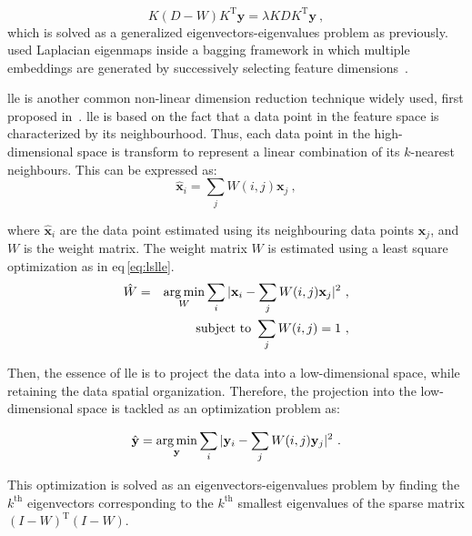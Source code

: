 \begin{equation}
  K (D-W) K^{\text{T}} \mathbf{y} = \lambda K D K^{\text{T}} \mathbf{y} \ ,
  \label{eq:sesmik}
\end{equation}
\noindent which is solved as a generalized eigenvectors-eigenvalues problem as previously.
\citeauthor{Viswanath2011} used Laplacian eigenmaps inside a bagging framework in which multiple embeddings are generated by successively selecting feature dimensions~\cite{Viswanath2011}.

\Ac{lle} is another common non-linear dimension reduction technique widely used, first proposed in~\cite{Roweis2000}.
\ac{lle} is based on the fact that a data point in the feature space is characterized by its neighbourhood.
Thus, each data point in the high-dimensional space is transform to represent a linear combination of its $k$-nearest neighbours.
This can be expressed as:
\begin{equation}
	\hat{\mathbf{x}}_i = \sum_j W(i,j) \mathbf{x}_j \ ,
	\label{eq:lincomlle}
\end{equation}

\noindent where $\hat{\mathbf{x}}_i$ are the data point estimated using its neighbouring data points $\mathbf{x}_j$, and $W$ is the weight matrix.
The weight matrix $W$ is estimated using a least square optimization as in \acs{eq}\,\eqref{eq:lslle}.
\begin{eqnarray}
	\hat{W} & = & \operatorname*{arg\,min}_{W} \sum_i | \mathbf{x}_i - \sum_j W(i,j)\mathbf{x}_j |^{2} \ , \label{eq:lslle} \\
	&& \text{subject to } \sum_j W(i,j) = 1 \ , \nonumber
\end{eqnarray}

Then, the essence of \ac{lle} is to project the data into a low-dimensional space, while retaining the data spatial organization.
Therefore, the projection into the low-dimensional space is tackled as an optimization problem as:

\begin{equation}
	\hat{\mathbf{y}} = \operatorname*{arg\,min}_{\mathbf{y}} \sum_i | \mathbf{y}_i - \sum_j W(i,j)\mathbf{y}_j |^{2} \ .
	\label{eq:lowprojlle}
\end{equation}

This optimization is solved as an eigenvectors-eigenvalues problem by finding the $k^{\text{th}}$ eigenvectors corresponding to the $k^{\text{th}}$ smallest eigenvalues of the sparse matrix $(I-W)^{\text{T}}(I-W)$.

